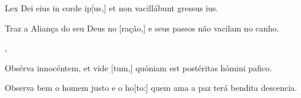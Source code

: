 {  {\item {}Lex Dei eius in corde ip[us,] et non vacillábunt gressus ius.~\Responsorium}%
    {\item {}Traz a Aliança do seu Deus no [ração,] e seus passos não vacilam no canho.~\Responsorium},
  {\item {}Obsérva innocéntem, et vide [tum,] quóniam est postéritas hómini pafico.~\Responsorium}%
    {\item {}Observa bem o homem justo e o ho[to:] quem ama a paz terá bendita descencia.~\Responsorium}
}